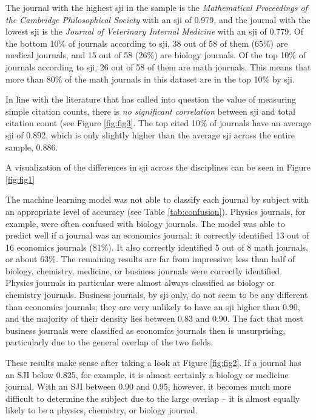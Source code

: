 \documentclass[12pt,english]{article}
\begin{document}
The journal with the highest sji in the sample is the \textit{Mathematical Proceedings of the Cambridge Philosophical Society} with an sji of 0.979, and the journal with the lowest sji is the \textit{Journal of Veterinary Internal Medicine} with an sji of 0.779. Of the bottom 10\% of journals according to sji, 38 out of 58 of them (65\%) are medical journals, and 15 out of 58 (26\%) are biology journals. Of the top 10\% of journals according to sji, 26 out of 58 of them are math journals. This means that more than 80\% of the math journals in this dataset are in the top 10\% by sji. 

In line with the literature that has called into question the value of measuring simple citation counts, there is \textit{no significant correlation} between sji and total citation count (see Figure \ref{fig:fig3}. The top cited 10\% of journals have an average sji of 0.892, which is only slightly higher than the average sji across the entire sample, 0.886.

A visualization of the differences in sji across the disciplines can be seen in Figure \ref{fig:fig1}

The machine learning model was not able to classify each journal by subject with an appropriate level of accuracy (see Table \ref{tab:confusion}). Physics journals, for example, were often confused with biology journals. The model was able to predict well if a journal was an economics journal: it correctly identified 13 out of 16 economics journals (81\%). It also correctly identified 5 out of 8 math journals, or about 63\%. The remaining results are far from impressive; less than half of biology, chemistry, medicine, or business journals were correctly identified. Physics journals in particular were almost always classified as biology or chemistry journals. Business journals, by sji only, do not seem to be any different than economics journals; they are very unlikely to have an sji higher than 0.90, and the majority of their density lies between 0.83 and 0.90. The fact that most business journals were classified as economics journals then is unsurprising, particularly due to the general overlap of the two fields. 

These results make sense after taking a look at Figure \ref{fig:fig2}. If a journal has an SJI below 0.825, for example, it is almost certainly a biology or medicine journal. With an SJI between 0.90 and 0.95, however, it becomes much more difficult to determine the subject due to the large overlap -- it is almost equally likely to be a physics, chemistry, or biology journal.
\end{document}
